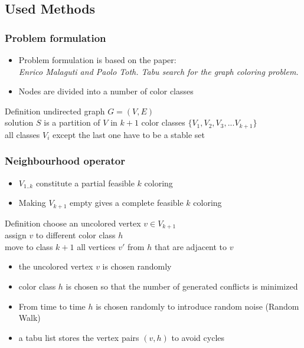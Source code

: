 \documentclass{beamer}
\begin{document}
\subsection{Used Methods}
\begin{frame}
    \frametitle{Problem formulation}
\begin{itemize}
\item Problem formulation is based on the paper:\\
  \emph{Enrico Malaguti and Paolo Toth. Tabu search for the graph coloring problem.}
    \item Nodes are divided into a number of color classes
    \end{itemize}
         \begin{block}{Definition}
           undirected graph $G = (V,E)$ \\
           solution $S$ is a partition of $V$ in $k+1$ color classes 
           $\lbrace V_1, V_2, V_3, ... V_{k+1} \rbrace$ \\
           all classes $V_i$ except the last one have to be a stable set
       \end{block}
    
  \end{frame}

\begin{frame}
    \frametitle{Neighbourhood operator}

    \begin{itemize}
    \item $V_{1..k}$ constitute a partial feasible $k$ coloring
    \item Making $V_{k+1}$ empty gives a complete feasible $k$ coloring
    \end{itemize}

       \begin{block}{Definition}
           choose an uncolored vertex $v \in V_{k+1}$ \\
           assign $v$ to different color class $h$\\
           move to class $k+1$ all vertices $v'$ from $h$ that are adjacent to $v$
       \end{block}

       \begin{itemize}
     \item the uncolored vertex $v$ is chosen randomly
     \item color class $h$ is chosen so that the number of generated conflicts is minimized
     \item From time to time $h$ is chosen randomly to introduce random noise (Random Walk)
     \item a tabu list stores the vertex pairs $(v,h)$ to avoid cycles


       \end{itemize}

\end{frame}
\end{document}
